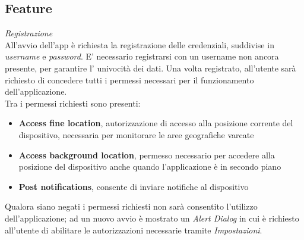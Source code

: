 \documentclass{article}
\begin{document}
\newpage
\subsection*{Feature}
\textit{Registrazione} \vspace*{7pt}\\
All'avvio dell'app è richiesta la registrazione delle credenziali, suddivise in \textit{username} e \textit{password}. E' necessario registrarsi con un username non ancora presente, per garantire l' univocità dei dati. Una volta registrato, all'utente sarà richiesto di concedere tutti i permessi necessari per il funzionamento dell'applicazione. \\
Tra i permessi richiesti sono presenti:
\begin{itemize}
    \renewcommand{\labelitemi}{-}
    \item \textbf{Access fine location}, autorizzazione di accesso alla posizione corrente del dispositivo, necessaria per monitorare le aree geografiche varcate
    \item \textbf{Access background location}, permesso necessario per accedere alla posizione del dispositivo anche quando l'applicazione è in secondo piano
    \item \textbf{Post notifications}, consente di inviare notifiche al dispositivo
\end{itemize}
Qualora siano negati i permessi richiesti non sarà consentito l'utilizzo dell'applicazione; ad un nuovo avvio è mostrato un \textit{Alert Dialog} in cui è richiesto all'utente di abilitare le autorizzazioni necessarie tramite \textit{Impostazioni}. \vspace*{7pt}\\
\end{document}
